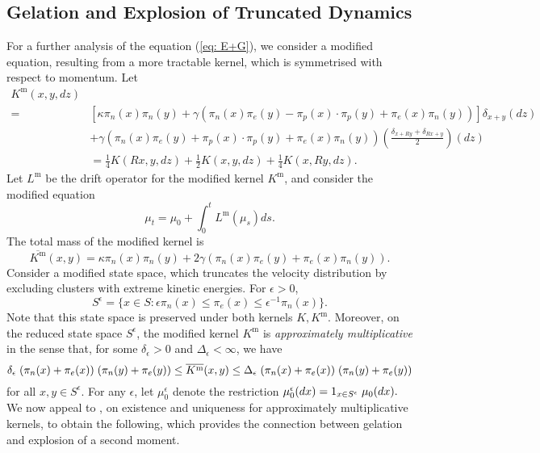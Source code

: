 \subsection{Gelation and Explosion of Truncated Dynamics}
 For a further analysis of the equation (\ref{eq: E+G}), we consider a modified equation, resulting from a more tractable kernel, which is symmetrised with respect to momentum. Let
 \begin{equation}\label{eq: modified K} 
 \begin{split}
 K^\mathrm{m}(x,y,dz)& \\  = & \left[\kappa \pi_n(x) \pi_n(y) +\gamma\left(\pi_n(x)\pi_e(y)-\pi_p(x)\cdot \pi_p(y)+ \pi_e(x)\pi_n(y)\right)\right]\delta_{x+y}(dz) \\ & + \gamma(\pi_n(x)\pi_e(y)+\pi_p(x)\cdot \pi_p(y)+ \pi_e(x)\pi_n(y))\left(\frac{\delta_{x+Ry}+\delta_{Rx+y}}{2}\right)(dz) \\ & 
 =\frac{1}{4}K(Rx, y, dz)+\frac{1}{2}K(x,y,dz)+\frac{1}{4}K(x,Ry, dz). \end{split} 
\end{equation}
Let $L^\mathrm{m}$ be the drift operator for the modified kernel $K^\mathrm{m}$, and consider the modified equation \begin{equation} \tag{mE-G}\label{eq: mE}
    \mu_t=\mu_0+\int_0^t L^\mathrm{m}(\mu_s)ds.
\end{equation}The total mass of the modified kernel is \begin{equation}
    \label{eq: modified Kbar} 
    \overline{K^\mathrm{m}}(x,y)=\kappa \pi_n(x) \pi_n(y) + 2\gamma(\pi_n(x)\pi_e(y)+\pi_e(x)\pi_n(y)).
\end{equation}
Consider a modified state space, which truncates the velocity distribution by excluding clusters with extreme kinetic energies.  For $\epsilon>0$, \begin{equation}
    S^\epsilon= \{x\in S: \epsilon \pi_n(x) \leq \pi_e(x) \leq \epsilon^{-1} \pi_n(x)\}.
\end{equation} Note that this state space is preserved under both kernels $K, K^\mathrm{m}$. Moreover, on the reduced state space $S^\epsilon$, the modified kernel $K^\mathrm{m}$ is \emph{approximately multiplicative} \cite{N00} in the sense that, for some $\delta_\epsilon>0$ and $\Delta_\epsilon<\infty$, we have \begin{equation}
    \delta_\epsilon\hspace{0.1cm} (\pi_n(x)+\pi_e(x))\hspace{0.1cm}(\pi_n(y)+\pi_e(y)) \leq \overline{K^\mathrm{m}}(x,y) \leq  \Delta_\epsilon\hspace{0.1cm} (\pi_n(x)+\pi_e(x))\hspace{0.1cm}(\pi_n(y)+\pi_e(y))
\end{equation}for all $x,y \in S^\epsilon$. For any $\epsilon$, let $\mu_0^\epsilon$ denote the restriction $\mu_0^\epsilon(dx)=1_{x\in S^\epsilon}\hspace{0.1cm}\mu_0(dx).$ We now appeal to \cite[Theorem 2.2]{N00}, on existence and uniqueness for approximately multiplicative kernels, to obtain the following, which provides the connection between gelation and explosion of a second moment.
